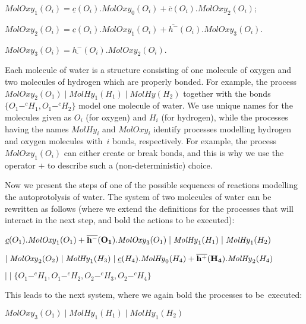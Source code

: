 \documentclass[runningheads]{llncs}
\newcommand{\MolOxy}{\mathit{MolOxy}}
\newcommand{\MolHy}{\mathit{MolHy}}
\begin{document}
$\MolOxy_1(O_i) = \underline{c}(O_i).\MolOxy_0(O_i) +\overline{c}(O_i).\MolOxy_2(O_i)$;
\vspace{1mm}

$\MolOxy_2(O_i) = \underline{c}(O_i).\MolOxy_1(O_i) +\overline{h^-}(O_i).\MolOxy_3(O_i)$.
\vspace{1mm}

$\MolOxy_3(O_i) = \underline{h^-}(O_i).\MolOxy_2(O_i)$.
\vspace{1mm}

\noindent 
Each molecule of water is a structure consisting of one molecule of oxygen 
and two molecules of hydrogen which are properly bonded. For example, the process 
$\MolOxy_2(O_1) \mid \MolHy_1(H_1) \mid \MolHy(H_2) $ together with the 
bonds $\{O_1 -^c H_1, O_1 -^c H_2\}$ model one molecule of water. We use 
unique names for the molecules given as $O_i$ (for oxygen) and $H_i$ (for 
hydrogen), while the processes having the names $\MolHy_i$ and $\MolOxy_i$ 
identify processes modelling hydrogen and oxygen molecules with~$i$ bonds, 
respectively. For example, the process $MolOxy_1(O_i)$ can either create or break 
bonds, and this is why we use the operator $+$ to describe such a  
(non-deterministic) choice.

Now we present the steps of one of the possible sequences of reactions modelling the 
autoprotolysis of water. The system of two molecules of water can be 
rewritten as follows (where we extend the definitions for the processes 
that will interact in the next step, and bold the actions to be executed):

\begin{center}$\underline{c}(O_1).\MolOxy_1(O_1) +{\bf \overline{h^-}(O_1)}.\MolOxy_3(O_1) \mid \MolHy_1(H_1) \mid \MolHy_1(H_2) $
\end{center}

\begin{center}$\mid \MolOxy_2(O_2) \mid \MolHy_1(H_3) \mid \underline{c}(H_4).
\MolHy_0(H_4) + {\bf \overline{h^+}(H_4)}.\MolHy_2(H_4)$
\end{center}

\begin{center}$\mid\mid \{O_1 -^c H_1, O_1 -^c H_2, O_2 -^c H_3, O_2 -^c H_4\}$
\end{center}

\noindent 
This leads to the next system, where we again bold the processes to be~executed:
\begin{center}$\MolOxy_3(O_1) \mid \MolHy_1(H_1) \mid \MolHy_1(H_2) $
\end{center}
\end{document}
